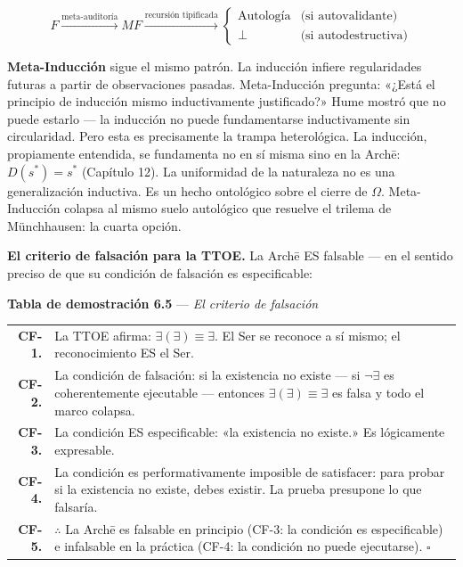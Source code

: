 \documentclass[10pt, openany, oneside]{book}
\renewcommand{\footnotesize}{\fontsize{8.5}{11}\selectfont}
\begin{document}
$$F \xrightarrow{\text{meta-auditoría}} MF \xrightarrow{\text{recursión tipificada}} \begin{cases} \text{Autología} & \text{(si autovalidante)} \\ \bot & \text{(si autodestructiva)} \end{cases}$$

\textbf{Meta-Inducción} sigue el mismo patrón. La inducción infiere regularidades futuras a partir de observaciones pasadas. Meta-Inducción pregunta: «¿Está el principio de inducción mismo inductivamente justificado?» Hume mostró que no puede estarlo --- la inducción no puede fundamentarse inductivamente sin circularidad. Pero esta es precisamente la trampa heterológica. La inducción, propiamente entendida, se fundamenta no en sí misma sino en la Arch\={e}: $D(s^*) = s^*$ (Capítulo 12). La uniformidad de la naturaleza no es una generalización inductiva. Es un hecho ontológico sobre el cierre de $\Omega$. Meta-Inducción colapsa al mismo suelo autológico que resuelve el trilema de M\"{u}nchhausen: la cuarta opción.

\textbf{El criterio de falsación para la TTOE.} La Arch\={e} ES falsable --- en el sentido preciso de que su condición de falsación es especificable:

\vspace{0.5em}

\textbf{Tabla de demostración 6.5} --- \textit{El criterio de falsación}

\vspace{0.5em}

{\footnotesize
\noindent\begin{tabular}{r p{}}
\textbf{CF-1.} & La TTOE afirma: $\exists(\exists) \equiv \exists$. El Ser se reconoce a sí mismo; el reconocimiento ES el Ser. \\[0.3em]
\textbf{CF-2.} & La condición de falsación: si la existencia no existe --- si $\neg\exists$ es coherentemente ejecutable --- entonces $\exists(\exists) \equiv \exists$ es falsa y todo el marco colapsa. \\[0.3em]
\textbf{CF-3.} & La condición ES especificable: «la existencia no existe.» Es lógicamente expresable. \\[0.3em]
\textbf{CF-4.} & La condición es performativamente imposible de satisfacer: para probar si la existencia no existe, debes existir. La prueba presupone lo que falsaría. \\[0.3em]
\textbf{CF-5.} & $\therefore$ La Arch\={e} es falsable en principio (CF-3: la condición es especificable) e infalsable en la práctica (CF-4: la condición no puede ejecutarse). $\square$ \\[0.3em]
\end{tabular}
}
\end{document}
